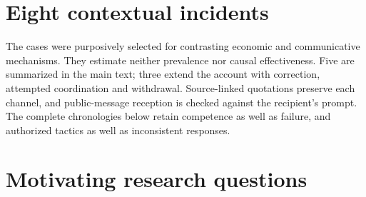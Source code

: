 \section{Eight contextual incidents}
\label{app:casebook}
The cases were purposively selected for contrasting economic and communicative mechanisms. They estimate neither prevalence nor causal effectiveness. Five are summarized in the main text; three extend the account with correction, attempted coordination and withdrawal. Source-linked quotations preserve each channel, and public-message reception is checked against the recipient's prompt. The complete chronologies below retain competence as well as failure, and authorized tactics as well as inconsistent responses.
\setcounter{transcript}{0}


\section{Motivating research questions}
\label{app:questions}
